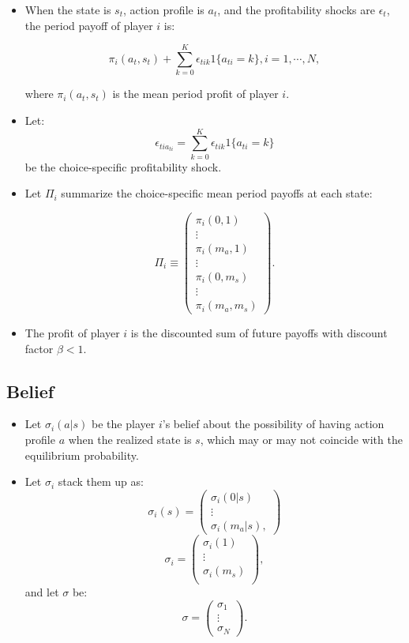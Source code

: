 \documentclass[]{book}
\providecommand{\tightlist}{%
  \setlength{\itemsep}{0pt}\setlength{\parskip}{0pt}}
\begin{document}
\begin{itemize}
\item
  When the state is \(s_t\), action profile is \(a_t\), and the
  profitability shocks are \(\epsilon_t\), the period payoff of player
  \(i\) is:

  \begin{equation}
  \pi_i(a_t, s_t) + \sum_{k = 0}^K \epsilon_{tik}1\{a_{ti} = k\}, i = 1, \cdots, N,
  \end{equation}

  where \(\pi_i(a_t, s_t)\) is the mean period profit of player \(i\).
\item
  Let: \[
  \epsilon_{ti a_{ti}} = \sum_{k = 0}^K \epsilon_{tik}1\{a_{ti} = k\}
  \] be the choice-specific profitability shock.
\item
  Let \(\Pi_i\) summarize the choice-specific mean period payoffs at
  each state:

  \begin{equation}
  \Pi_i \equiv
  \begin{pmatrix}
  \pi_i(0, 1)\\
  \vdots\\
  \pi_i(m_a, 1)\\
  \vdots\\
  \pi_i(0, m_s)\\
  \vdots\\
  \pi_i(m_a, m_s)
  \end{pmatrix}.
  \end{equation}
\item
  The profit of player \(i\) is the discounted sum of future payoffs
  with discount factor \(\beta < 1\).
\end{itemize}

\subsection{Belief}\label{belief-1}

\begin{itemize}
\tightlist
\item
  Let \(\sigma_i(a|s)\) be the player \(i\)'s belief about the
  possibility of having action profile \(a\) when the realized state is
  \(s\), which may or may not coincide with the equilibrium probability.
\item
  Let \(\sigma_i\) stack them up as: \[
  \sigma_i(s) =
  \begin{pmatrix}
  \sigma_i(0|s)\\
  \vdots\\
  \sigma_i(m_a|s),
  \end{pmatrix}
  \] \[
  \sigma_i =
  \begin{pmatrix}
  \sigma_i(1)\\
  \vdots \\
  \sigma_i(m_s)\\
  \end{pmatrix},
  \] and let \(\sigma\) be: \[
  \sigma = 
  \begin{pmatrix}
  \sigma_1 \\
  \vdots\\
  \sigma_N
  \end{pmatrix}.
  \]
\end{itemize}
\end{document}
